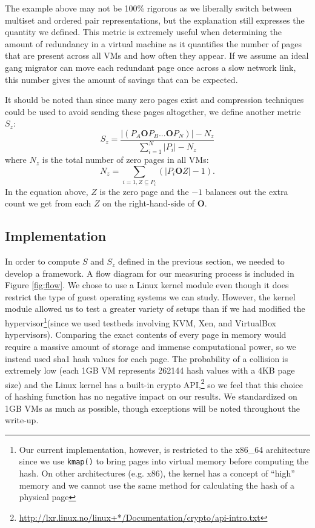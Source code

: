 \documentclass{acm_proc_article-sp}
\begin{document}
The example above may not be 100\% rigorous as we liberally switch between multiset and ordered pair representations, but the explanation still expresses the quantity we defined.  This metric is extremely useful when determining the amount of redundancy in a virtual machine as it quantifies the number of pages that are present across all VMs and how often they appear.  If we assume an ideal gang migrator can move each redundant page once across a slow network link, this number gives the amount of savings that can be expected.

It should be noted than since many zero pages exist and compression techniques could be used to avoid sending these pages altogether\cite{live_adaptive_compress}, we define another metric $S_z$:
\begin{equation}
S_z = \frac{|(P_A \mathbf{O} P_B ... \mathbf{O} P_N)|-N_z}{\sum\limits_{i=1}^{N}|P_i|-N_z}
\end{equation}
where $N_z$ is the total number of zero pages in all VMs:
\begin{equation}
N_z = \sum\limits_{i=1,Z\subseteq P_i}\left(|P_i\mathbf{O}Z|-1\right).
\end{equation}\label{eqn:sz}
In the equation above, $Z$ is the zero page and the $-1$ balances out the extra count we get from each $Z$ on the right-hand-side of $\mathbf{O}$.

\subsection{Implementation}\label{sec:red_implementation}
In order to compute $S$ and $S_z$ defined in the previous section, we needed to develop a framework.  A flow diagram for our measuring process is included in Figure \ref{fig:flow}.  We chose to use a Linux kernel module even though it does restrict the type of guest operating systems we can study.  However, the kernel module allowed us to test a greater variety of setups than if we had modified the hypervisor\footnote{Our current implementation, however, is restricted to the x86\_64 architecture since we use {\tt kmap()} to bring pages into virtual memory before computing the hash.  On other architectures (e.g. x86), the kernel has a concept of ``high'' memory and we cannot use the same method for calculating the hash of a physical page}(since we used testbeds involving KVM, Xen, and VirtualBox hypervisors).  Comparing the exact contents of every page in memory would require a massive amount of storage and immense computational power, so we instead used sha1 hash values for each page.  The probability of a collision is extremely low (each 1GB VM represents 262144 hash values with a 4KB page size) and the Linux kernel has a built-in crypto API,\footnote{\url{http://lxr.linux.no/linux+*/Documentation/crypto/api-intro.txt}} so we feel that this choice of hashing function has no negative impact on our results.  We standardized on 1GB VMs as much as possible, though exceptions will be noted throughout the write-up.
\end{document}
